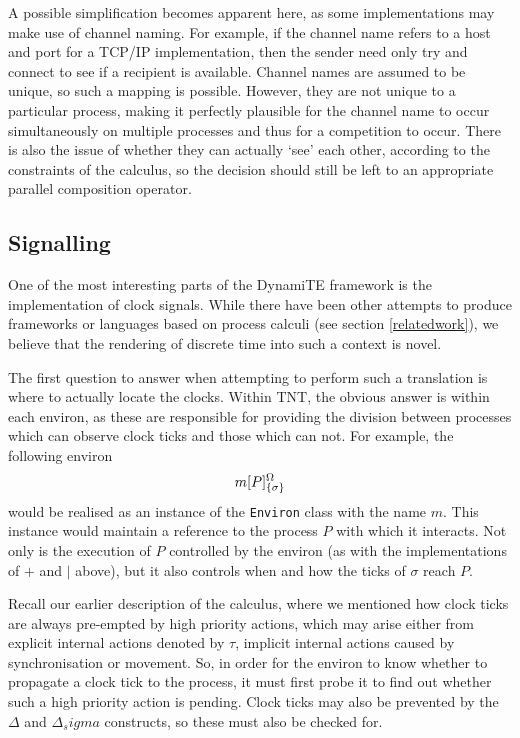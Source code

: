 A possible simplification becomes apparent here, as some implementations
may make use of channel naming.  For example, if the channel name refers
to a host and port for a TCP/IP implementation, then the sender need
only try and connect to see if a recipient is available.  Channel names
are assumed to be unique, so such a mapping is possible.  However, they
are not unique to a particular process, making it perfectly plausible
for the channel name to occur simultaneously on multiple processes and
thus for a competition to occur.  There is also the issue of whether
they can actually `see' each other, according to the constraints of the
calculus, so the decision should still be left to an appropriate
parallel composition operator.

\subsection{Signalling}
\label{signalling}

One of the most interesting parts of the DynamiTE framework is the
implementation of clock signals.  While there have been other attempts
to produce frameworks or languages based on process calculi (see section
\ref{relatedwork}), we believe that the rendering of discrete time into
such a context is novel.

The first question to answer when attempting to perform such a
translation is where to actually locate the clocks.  Within TNT, the
obvious answer is within each environ, as these are responsible for
providing the division between processes which can observe clock ticks
and those which can not.  For example, the following environ
\begin{displaymath}
{m}[ P ]^{\Omega}_{\{\sigma\}}
\end{displaymath}
would be realised as an instance of the \texttt{Environ} class with the
name $m$.  This instance would maintain a reference to the process $P$
with which it interacts.  Not only is the execution of $P$ controlled by
the environ (as with the implementations of $+$ and $\mid$ above), but
it also controls when and how the ticks of $\sigma$ reach $P$.

Recall our earlier description of the calculus, where we mentioned how
clock ticks are always pre-empted by high priority actions, which may
arise either from explicit internal actions denoted by $\tau$, implicit
internal actions caused by synchronisation or movement.  So, in order
for the environ to know whether to propagate a clock tick to the
process, it must first probe it to find out whether such a high priority
action is pending.  Clock ticks may also be prevented by the $\Delta$
and $\Delta_sigma$ constructs, so these must also be checked for.

